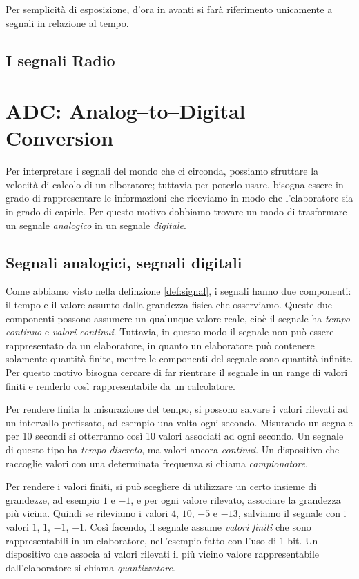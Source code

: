 Per semplicit\`a di esposizione, d'ora in avanti si far\`a riferimento
unicamente a segnali in relazione al tempo.
\subsection{I segnali Radio}
\section{ADC: Analog--to--Digital Conversion}
Per interpretare i segnali del mondo che ci circonda, possiamo sfruttare la
velocit\`a di calcolo di un elboratore; tuttavia per poterlo usare, bisogna
essere in grado di rappresentare le informazioni che riceviamo in modo che
l'elaboratore sia in grado di capirle. Per questo motivo dobbiamo trovare un
modo di trasformare un segnale \emph{analogico} in un segnale \emph{digitale}.
\subsection{Segnali analogici, segnali digitali}
Come abbiamo visto nella definzione \ref{def:signal}, i segnali hanno due
componenti: il tempo e il valore assunto dalla grandezza fisica che osserviamo.
Queste due componenti possono assumere un qualunque valore reale, cio\`e il
segnale ha \emph{tempo continuo} e \emph{valori continui}. Tuttavia, in questo
modo il segnale non pu\`o essere rappresentato da un elaboratore, in quanto un
elaboratore pu\`o contenere solamente quantit\`a finite, mentre le componenti
del segnale sono quantit\`a infinite. Per questo motivo bisogna cercare di far
rientrare il segnale in un range di valori finiti e renderlo cos\`i
rappresentabile da un calcolatore.

Per rendere finita la misurazione del tempo, si possono salvare i valori
rilevati ad un intervallo prefissato, ad esempio una volta ogni secondo.
Misurando un segnale per 10 secondi si otterranno cos\`i 10 valori associati ad
ogni secondo. Un segnale di questo tipo ha \emph{tempo discreto}, ma valori
ancora \emph{continui}. Un dispositivo che raccoglie valori con una determinata
frequenza si chiama \emph{campionatore}.

Per rendere i valori finiti, si pu\`o scegliere di utilizzare un certo insieme
di grandezze, ad esempio $1$ e $-1$, e per ogni valore rilevato, associare la
grandezza pi\`u vicina. Quindi se rileviamo i valori $4$, $10$, $-5$ e $-13$,
salviamo il segnale con i valori $1$, $1$, $-1$, $-1$. Cos\`i facendo, il
segnale assume \emph{valori finiti} che sono rappresentabili in un elaboratore,
nell'esempio fatto con l'uso di 1 bit. Un dispositivo che associa ai valori
rilevati il pi\`u vicino valore rappresentabile dall'elaboratore si chiama
\emph{quantizzatore}.


